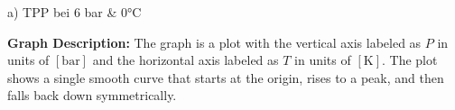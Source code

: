 a) TPP bei 6 bar \& 0°C

\textbf{Graph Description:} 
The graph is a plot with the vertical axis labeled as \( P \) in units of \([ \text{bar} ]\) and the horizontal axis labeled as \( T \) in units of \([ \text{K} ]\). The plot shows a single smooth curve that starts at the origin, rises to a peak, and then falls back down symmetrically.